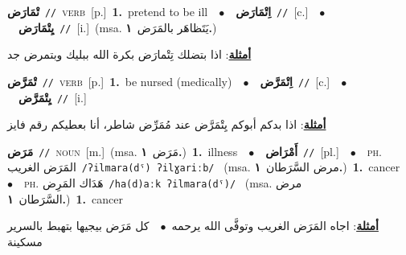 \documentclass[10pt,a4paper,twoside]{article} %
\begin{document}
\begin{multicols}{2}
{\setlength\topsep{0pt}\textbf{\foreignlanguage{arabic}{تْمَارَض}}\ {\color{gray}\texttt{//}\color{black}}\ \textsc{verb}\ [p.]\ \textbf{1.}~pretend to be ill\ \ $\bullet$\ \ \setlength\topsep{0pt}\textbf{\foreignlanguage{arabic}{اِتْمَارَض}}\ {\color{gray}\texttt{//}\color{black}}\ [c.]\ \ $\bullet$\ \ \setlength\topsep{0pt}\textbf{\foreignlanguage{arabic}{يِتْمَارَض}}\ {\color{gray}\texttt{//}\color{black}}\ [i.]\ \color{gray}(msa. \foreignlanguage{arabic}{يَتَظاهَر بالمَرَض}~\foreignlanguage{arabic}{\textbf{١.}})\color{black}\  \begin{flushright}\color{gray}\foreignlanguage{arabic}{\textbf{\underline{\foreignlanguage{arabic}{أمثلة}}}: اذا بتضلك تِتْمارَض بكرة الله ببليك وبتمرض جد}\end{flushright}\color{black}} \vspace{2mm}

{\setlength\topsep{0pt}\textbf{\foreignlanguage{arabic}{تْمَرَّض}}\ {\color{gray}\texttt{//}\color{black}}\ \textsc{verb}\ [p.]\ \textbf{1.}~be nursed (medically)\ \ $\bullet$\ \ \setlength\topsep{0pt}\textbf{\foreignlanguage{arabic}{اِتْمَرَّض}}\ {\color{gray}\texttt{//}\color{black}}\ [c.]\ \ $\bullet$\ \ \setlength\topsep{0pt}\textbf{\foreignlanguage{arabic}{يِتْمَرَّض}}\ {\color{gray}\texttt{//}\color{black}}\ [i.]\  \begin{flushright}\color{gray}\foreignlanguage{arabic}{\textbf{\underline{\foreignlanguage{arabic}{أمثلة}}}: اذا بدكم أبوكم يِتْمَرَّض عند مُمَرِّض شاطر، أنا بعطيكم رقم فايز}\end{flushright}\color{black}} \vspace{2mm}

{\setlength\topsep{0pt}\textbf{\foreignlanguage{arabic}{مَرَض}}\ {\color{gray}\texttt{//}\color{black}}\ \textsc{noun}\ [m.]\ \color{gray}(msa. \foreignlanguage{arabic}{مَرَض}~\foreignlanguage{arabic}{\textbf{١.}})\color{black}\ \textbf{1.}~illness\ \ $\bullet$\ \ \setlength\topsep{0pt}\textbf{\foreignlanguage{arabic}{أَمْرَاض}}\ {\color{gray}\texttt{//}\color{black}}\ [pl.]\ \ $\bullet$\ \ \textsc{ph.} \color{gray} \foreignlanguage{arabic}{المَرَض الغريب}\color{black}\ {\color{gray}\texttt{/{\sffamily ʔilmara(dˤ) ʔilɣariːb}/}\color{black}}\ \color{gray} (msa. \foreignlanguage{arabic}{مرض السَّرَطان}~\foreignlanguage{arabic}{\textbf{١.}})\color{black}\ \textbf{1.}~cancer\ \ $\bullet$\ \ \textsc{ph.} \color{gray} \foreignlanguage{arabic}{هَدَاك المَرِض}\color{black}\ {\color{gray}\texttt{/{\sffamily ha(d)aːk ʔilmara(dˤ)}/}\color{black}}\ \color{gray} (msa. \foreignlanguage{arabic}{مرض السَّرَطان}~\foreignlanguage{arabic}{\textbf{١.}})\color{black}\ \textbf{1.}~cancer\  \begin{flushright}\color{gray}\foreignlanguage{arabic}{\textbf{\underline{\foreignlanguage{arabic}{أمثلة}}}: اجاه المَرَض الغريب وتوفَّى الله يرحمه\ $\bullet$\ \  كل مَرَض بيجيها بتهبط بالسرير مسكينة}\end{flushright}\color{black}} \vspace{2mm}


\end{multicols}
\end{document}
